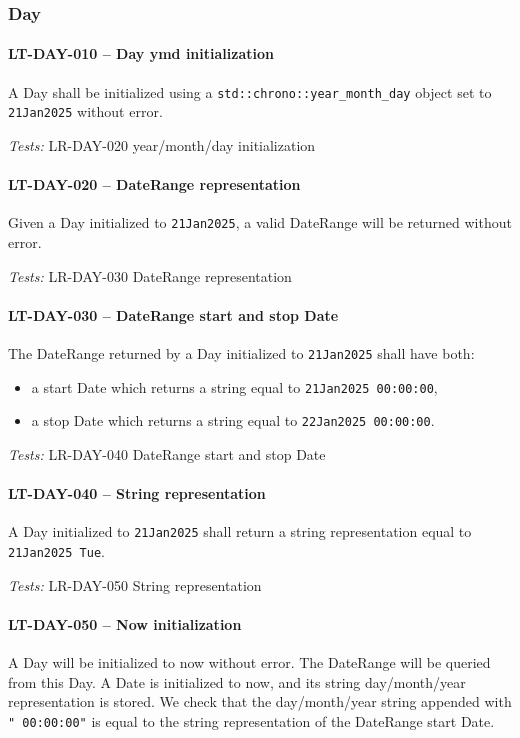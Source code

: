 \subsubsection{Day}
\paragraph{LT-DAY-010 -- Day ymd initialization}
A Day shall be initialized using a \lstinline{std::chrono::year_month_day}
object set to \lstinline{21Jan2025} without error.

\textit{Tests: } LR-DAY-020 year/month/day initialization

\paragraph{LT-DAY-020 -- DateRange representation}
Given a Day initialized to \lstinline{21Jan2025}, a valid DateRange
will be returned without error.

\textit{Tests: } LR-DAY-030 DateRange representation

\paragraph{LT-DAY-030 -- DateRange start and stop Date}
The DateRange returned by a Day initialized to \lstinline{21Jan2025}
shall have both:
\begin{itemize}
\item a start Date which returns a string equal to
  \lstinline{21Jan2025 00:00:00},
\item a stop Date which returns a string equal to
  \lstinline{22Jan2025 00:00:00}.
\end{itemize}

\textit{Tests: } LR-DAY-040 DateRange start and stop Date

\paragraph{LT-DAY-040 -- String representation}
A Day initialized to \lstinline{21Jan2025} shall return a string
representation equal to \lstinline{21Jan2025 Tue}.

\textit{Tests: } LR-DAY-050 String representation

\paragraph{LT-DAY-050 -- Now initialization}
A Day will be initialized to now without error. The DateRange will be queried
from this Day.
A Date is initialized to now, and its string day/month/year representation
is stored.
We check that the day/month/year string appended with \lstinline{" 00:00:00"} is
equal to the string representation of the DateRange start Date.

